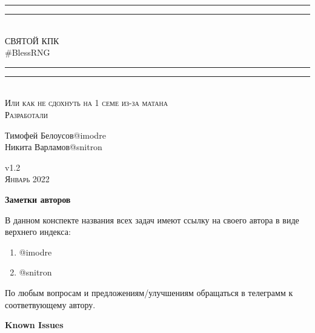\documentclass{article}
\begin{document}
\begin{titlepage}
    \centering
    \vspace*{\baselineskip}
    \rule{\textwidth}{1.6pt}\vspace*{-\baselineskip}\vspace*{2pt}
    \rule{\textwidth}{0.4pt}\\[\baselineskip]
{\LARGE СВЯТОЙ КПК\\ [0.3\baselineskip] \#BlessRNG}\\[0.2\baselineskip]
    \rule{\textwidth}{0.4pt}\vspace*{-\baselineskip}\vspace{3.2pt}
    \rule{\textwidth}{1.6pt}\\[\baselineskip]
    \scshape
    Или как не сдохнуть на 1 семе из-за матана \\
    \vspace*{2\baselineskip}
    Разработали \\[\baselineskip]
    {\Large Тимофей Белоусов\quad @imodre \\ Никита Варламов\quad @snitron\par}
    \vfill
    v1.2\\
    {\scshape Январь 2022} \par
\end{titlepage}

\textbf{Заметки авторов}

В данном конспекте названия всех задач имеют ссылку на своего автора в виде верхнего индекса:
\begin{enumerate}
    \item @imodre
    \item @snitron
\end{enumerate}
По любым вопросам и предложениям/улучшениям обращаться в телеграмм к соответвующему автору.

\textbf{Known Issues}
\end{document}
